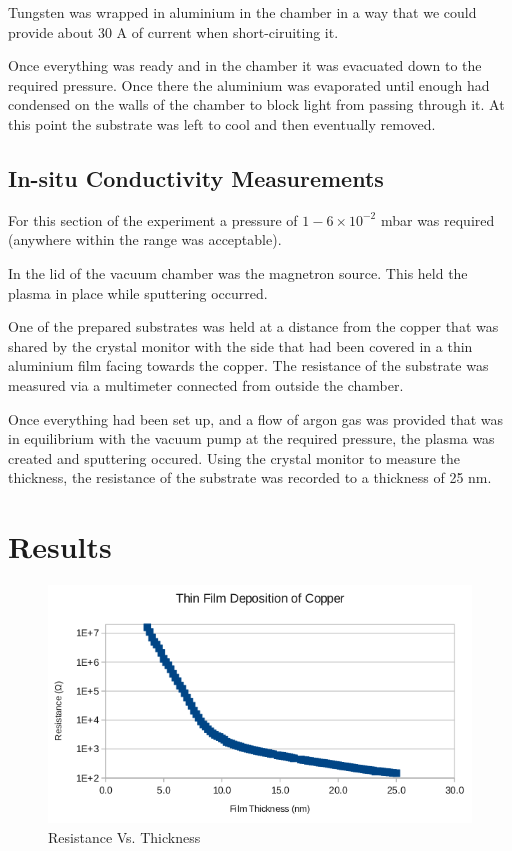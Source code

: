 \documentclass[aps,prl,twocolumn,groupedaddress,showkeys]{revtex4}
\begin{document}
Tungsten was wrapped in aluminium in the chamber in a way that we could provide about 30 A of current when short-ciruiting it.

Once everything was ready and in the chamber it was evacuated down to the required pressure. Once there the aluminium was evaporated until enough had condensed on the walls of the chamber to block light from passing through it. At this point the substrate was left to cool and then eventually removed.


\subsection{In-situ Conductivity Measurements}

For this section of the experiment a pressure of $1-6\times10^{-2}$ mbar was required (anywhere within the range was acceptable).

In the lid of the vacuum chamber was the magnetron source. This held the plasma in place while sputtering occurred.

One of the prepared substrates was held at a distance from the copper that was shared by the crystal monitor with the side that had been covered in a thin aluminium film facing towards the copper. The resistance of the substrate was measured via a multimeter connected from outside the chamber.

Once everything had been set up, and a flow of argon gas was provided that was in equilibrium with the vacuum pump at the required pressure, the plasma was created and sputtering occured. Using the crystal monitor to measure the thickness, the resistance of the substrate was recorded to a thickness of 25 nm.


\section{Results}

\begin{figure}[h]
	\includegraphics[width=\linewidth]{copperSputtering.png}
	\caption{Resistance Vs. Thickness}
	\label{fig:copperSputtering}
\end{figure}
\end{document}
